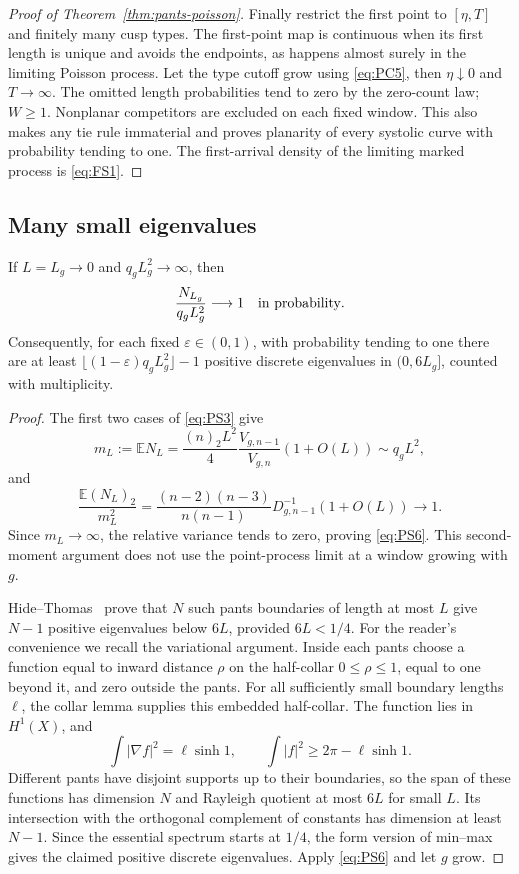\begin{proof}[Proof of Theorem~\ref{thm:pants-poisson}]
Finally restrict the first point to $[\eta,T]$ and finitely many cusp
types. The first-point map is continuous when its first length is
unique and avoids the endpoints, as happens almost surely in the
limiting Poisson process. Let the type cutoff grow using
\eqref{eq:PC5}, then $\eta\downarrow0$ and $T\to\infty$.
The omitted length probabilities tend to zero by the zero-count law;
$W\ge1$. Nonplanar competitors are excluded on each fixed window.
This also makes any tie rule immaterial and proves planarity of every
systolic curve with probability tending to one. The first-arrival
density of the limiting marked process is \eqref{eq:FS1}.
\end{proof}

\subsection{Many small eigenvalues}\label{sec:pants-eigenvalues}

\begin{proposition}\label{prop:pants-concentration}
If $L=L_g\to0$ and $q_gL_g^2\to\infty$, then
\begin{equation}
 \frac{N_{L_g}}{q_gL_g^2}\longrightarrow1
 \quad\hbox{in probability}.
 \label{eq:PS6}
\end{equation}
Consequently, for each fixed $\varepsilon\in(0,1)$, with probability
tending to one there are at least
$\lfloor(1-\varepsilon)q_gL_g^2\rfloor-1$ positive discrete eigenvalues
in $(0,6L_g]$, counted with multiplicity.
\end{proposition}
\begin{proof}
The first two cases of \eqref{eq:PS3} give
\[
 m_L:=\mathbb E N_L=\frac{(n)_2L^2}{4}
       \frac{V_{g,n-1}}{V_{g,n}}(1+O(L))\sim q_gL^2,
\]
and
\[
 \frac{\mathbb E(N_L)_2}{m_L^2}
 =\frac{(n-2)(n-3)}{n(n-1)}D_{g,n-1}^{-1}(1+O(L))\longrightarrow1.
\]
Since $m_L\to\infty$, the relative variance tends to zero, proving
\eqref{eq:PS6}. This second-moment argument does not use the point-process
limit at a window growing with $g$.

Hide--Thomas~\cite[Lemma~5.3]{HTSphere} prove that $N$ such pants
boundaries of length at most $L$ give $N-1$ positive eigenvalues below
$6L$, provided $6L<1/4$. For the reader's convenience we recall the
variational argument.
Inside each pants choose a function equal to inward distance $\rho$ on
the half-collar $0\le\rho\le1$, equal to one beyond it, and zero outside
the pants. For all sufficiently small boundary lengths $\ell$, the
collar lemma supplies this embedded half-collar. The function lies in
$H^1(X)$, and
\[
 \int|\nabla f|^2=\ell\sinh1,\qquad
 \int|f|^2\ge2\pi-\ell\sinh1.
\]
Different pants have disjoint supports up to their boundaries, so the
span of these functions has dimension $N$ and Rayleigh quotient at most
$6L$ for small $L$. Its intersection with the orthogonal complement of
constants has dimension at least $N-1$. Since the essential spectrum
starts at $1/4$, the form version of min--max gives the claimed positive
discrete eigenvalues. Apply \eqref{eq:PS6} and let $g$ grow.
\end{proof}

